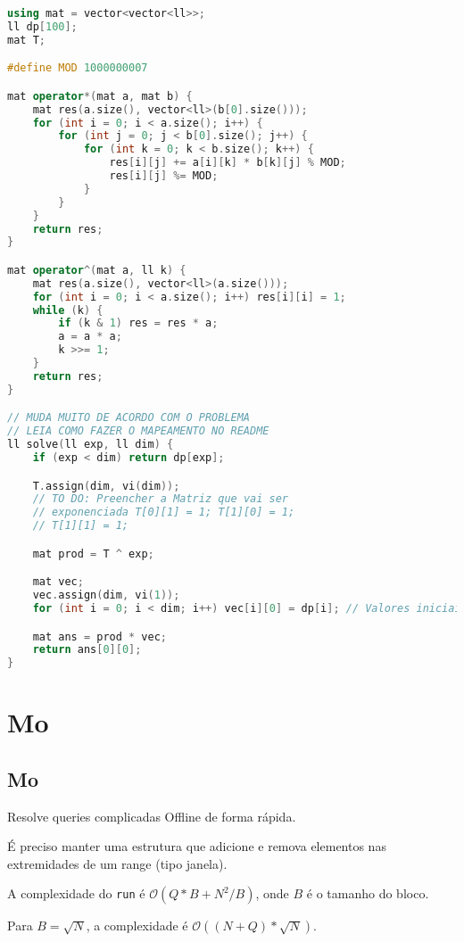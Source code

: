 \documentclass[10pt, a4paper, oneside]{book}
\begin{document}
\begin{lstlisting}[language=C++]
using mat = vector<vector<ll>>;
ll dp[100];
mat T;

#define MOD 1000000007

mat operator*(mat a, mat b) {
    mat res(a.size(), vector<ll>(b[0].size()));
    for (int i = 0; i < a.size(); i++) {
        for (int j = 0; j < b[0].size(); j++) {
            for (int k = 0; k < b.size(); k++) {
                res[i][j] += a[i][k] * b[k][j] % MOD;
                res[i][j] %= MOD;
            }
        }
    }
    return res;
}

mat operator^(mat a, ll k) {
    mat res(a.size(), vector<ll>(a.size()));
    for (int i = 0; i < a.size(); i++) res[i][i] = 1;
    while (k) {
        if (k & 1) res = res * a;
        a = a * a;
        k >>= 1;
    }
    return res;
}

// MUDA MUITO DE ACORDO COM O PROBLEMA
// LEIA COMO FAZER O MAPEAMENTO NO README
ll solve(ll exp, ll dim) {
    if (exp < dim) return dp[exp];

    T.assign(dim, vi(dim));
    // TO DO: Preencher a Matriz que vai ser
    // exponenciada T[0][1] = 1; T[1][0] = 1;
    // T[1][1] = 1;

    mat prod = T ^ exp;

    mat vec;
    vec.assign(dim, vi(1));
    for (int i = 0; i < dim; i++) vec[i][0] = dp[i]; // Valores iniciais

    mat ans = prod * vec;
    return ans[0][0];
}
\end{lstlisting}
\hfill

\section{Mo}
\subsection{Mo}


Resolve queries complicadas Offline de forma rápida.  



É preciso manter uma estrutura que adicione e remova elementos nas extremidades de um range (tipo janela).



A complexidade do \texttt{run} é $\mathcal{O}(Q * B + N^2/B)$, onde $B$ é o tamanho do bloco.



Para $B = \sqrt{N}$, a complexidade é $\mathcal{O}((N + Q) * \sqrt{N})$.
\end{document}
